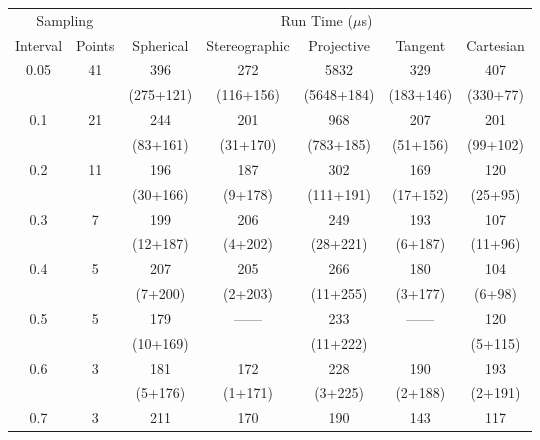 \documentclass[12pt]{article}
\numberwithin{equation}{section}
\begin{document}
\begin{table}[!htbp]
\color{blue}
  \begin{center}
    \begin{tabular}{c c | c c c c c}
      \toprule
      \multicolumn{2}{c}{Sampling} & \multicolumn{5}{c}{Run Time ($\mu$s)} \\
      Interval  & Points  & Spherical  &  Stereographic & Projective  &  Tangent  & Cartesian \\
      \midrule
      \multirow{2}{*}{0.05}  &  \multirow{2}{*}{41}  &  396  &  272  &  5832  &  329  &  407  \\      
      {}  &  {}  &  (275+121) & (116+156)  &  (5648+184)  &  (183+146)  &  (330+77)   \\
      \midrule
      \multirow{2}{*}{0.1}   &  \multirow{2}{*}{21}  &  244  &  201  &  968  &  207  &  201  \\            
      {}  &  {}  &  (83+161)  &  (31+170)  &  (783+185)   &  (51+156)  &  (99+102)   \\
      \midrule      
      \multirow{2}{*}{0.2}   &  \multirow{2}{*}{11}  &  196  &  187  &  302  &  169  &  120  \\     
      {}  &  {}  &  (30+166)  &  (9+178)  &  (111+191)   &  (17+152)  &  (25+95)   \\
      \midrule      
      \multirow{2}{*}{0.3}   &  \multirow{2}{*}{7}  &  199  &  206  &  249  &  193  &  107  \\  
      {}  &  {}  &  (12+187)  &  (4+202)  &  (28+221)   &  (6+187)  &  (11+96)   \\
      \midrule      
      \multirow{2}{*}{0.4}   &  \multirow{2}{*}{5}  &  207  &  205  &  266  &  180  &  104  \\        
      {}  &  {}  &  (7+200)  &  (2+203)  &  (11+255)   &  (3+177)  &  (6+98)   \\
      \midrule      
      \multirow{2}{*}{0.5}   &  \multirow{2}{*}{5}  &  179  &  \multirow{2}{*}{------}  
        &  233  &  \multirow{2}{*}{------}  &  120  \\  
      {}  &  {}  &	 (10+169)  &  {}  &  (11+222)   &  {}  &  (5+115)   \\
      \midrule      
      \multirow{2}{*}{0.6}   &  \multirow{2}{*}{3}  &  181  &  172  &  228  &  190  &  193  \\      
      {}  &  {}  &  (5+176)  &  (1+171)  &  (3+225)   &  (2+188)  &  (2+191)   \\
      \midrule      
      \multirow{2}{*}{0.7}   &  \multirow{2}{*}{3}  &  211  &  170  &  190  &  143  &  117  \\

\end{tabular}
\end{center}
\end{table}
\end{document}

